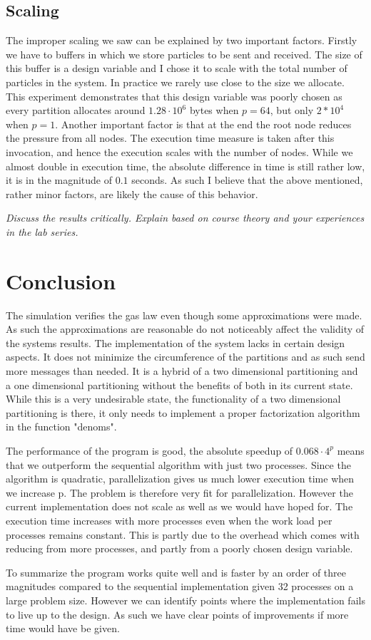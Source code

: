 \documentclass{article}
\begin{document}
\subsection{Scaling}
The improper scaling we saw can be explained by two important factors. Firstly we have to buffers in which we store particles to be sent and received. The size of this buffer is a design variable and I chose it to scale with the total number of particles in the system. In practice we rarely use close to the size we allocate. This experiment demonstrates that this design variable was poorly chosen as every partition allocates around $1.28 \cdot 10^6$ bytes when $p=64$, but only $2*10^4$ when $p=1$. Another important factor is that at the end the root node reduces the pressure from all nodes. The execution time measure is taken after this invocation, and hence the execution scales with the number of nodes. While we almost double in execution time, the absolute difference in time is still rather low, it is in the magnitude of $0.1$ seconds. As such I believe that the above mentioned, rather minor factors, are likely the cause of this behavior.


\emph{Discuss the results critically. Explain based on course theory and your experiences in the lab series.}

\section{Conclusion}
The simulation verifies the gas law even though some approximations were made. As such the approximations are reasonable do not noticeably affect the validity of the systems results. The implementation of the system lacks in certain design aspects. It does not minimize the circumference of the partitions and as such send more messages than needed. It is a hybrid of a two dimensional partitioning and a one dimensional partitioning without the benefits of both in its current state. While this is a very undesirable state, the functionality of a two dimensional partitioning is there, it only needs to implement a proper factorization algorithm in the function "denoms".


The performance of the program is good, the absolute speedup of $0.068 \cdot 4^p$ means that we outperform the sequential algorithm with just two processes. Since the algorithm is quadratic, parallelization gives us much lower execution time when we increase p. The problem is therefore very fit for parallelization. However the current implementation does not scale as well as we would have hoped for. The execution time increases with more processes even when the work load per processes remains constant. This is partly due to the overhead which comes with reducing from more processes, and partly from a poorly chosen design variable.


To summarize the program works quite well and is faster by an order of three magnitudes compared to the sequential implementation given 32 processes on a large problem size. However we can identify points where the implementation fails to live up to the design. As such we have clear points of improvements if more time would have be given.




\end{document}

